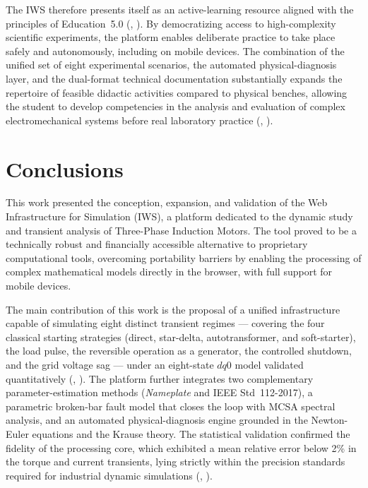 \documentclass[a4paper]{ifacconf}
\begin{document}
The IWS therefore presents itself as an active-learning resource aligned with the principles of Education~5.0 (\citeauthor{cordeiro2024educacao}, \citeyear{cordeiro2024educacao}). By democratizing access to high-complexity scientific experiments, the platform enables deliberate practice to take place safely and autonomously, including on mobile devices. The combination of the unified set of eight experimental scenarios, the automated physical-diagnosis layer, and the dual-format technical documentation substantially expands the repertoire of feasible didactic activities compared to physical benches, allowing the student to develop competencies in the analysis and evaluation of complex electromechanical systems before real laboratory practice (\citeauthor{singh2019improving}, \citeyear{singh2019improving}).

\section{Conclusions}

This work presented the conception, expansion, and validation of the Web Infrastructure for Simulation (IWS), a platform dedicated to the dynamic study and transient analysis of Three-Phase Induction Motors. The tool proved to be a technically robust and financially accessible alternative to proprietary computational tools, overcoming portability barriers by enabling the processing of complex mathematical models directly in the browser, with full support for mobile devices.

The main contribution of this work is the proposal of a unified infrastructure capable of simulating eight distinct transient regimes --- covering the four classical starting strategies (direct, star-delta, autotransformer, and soft-starter), the load pulse, the reversible operation as a generator, the controlled shutdown, and the grid voltage sag --- under an eight-state $dq0$ model validated quantitatively (\citeauthor{usta2024mathematical}, \citeyear{usta2024mathematical}). The platform further integrates two complementary parameter-estimation methods (\textit{Nameplate} and IEEE Std~112-2017), a parametric broken-bar fault model that closes the loop with MCSA spectral analysis, and an automated physical-diagnosis engine grounded in the Newton-Euler equations and the Krause theory. The statistical validation confirmed the fidelity of the processing core, which exhibited a mean relative error below 2\% in the torque and current transients, lying strictly within the precision standards required for industrial dynamic simulations (\citeauthor{leroux2022static}, \citeyear{leroux2022static}).
\end{document}
